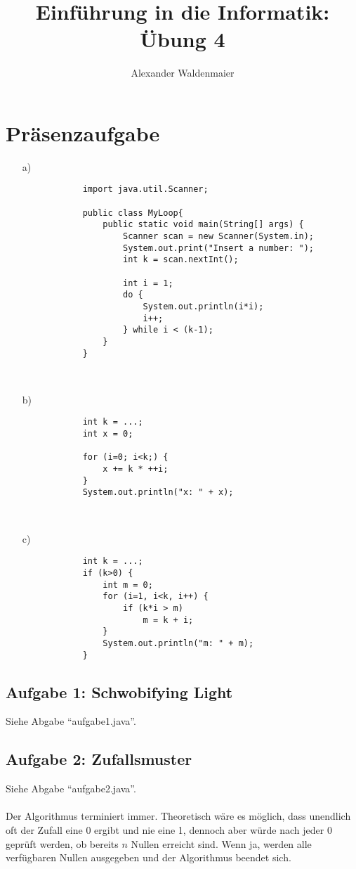 \documentclass{article}
\title{Einführung in die Informatik: Übung 4}
\author{Alexander Waldenmaier}
\begin{document}
    \maketitle

    \section*{Präsenzaufgabe}
    \begin{enumerate}
        \item[a)] 
        \begin{lstlisting}
            import java.util.Scanner;

            public class MyLoop{
                public static void main(String[] args) {
                    Scanner scan = new Scanner(System.in);
                    System.out.print("Insert a number: ");
                    int k = scan.nextInt();

                    int i = 1; 
                    do {
                        System.out.println(i*i);
                        i++;
                    } while i < (k-1);
                }
            }
        \end{lstlisting} \hfill\\
        \item[b)] 
        \begin{lstlisting}
            int k = ...;
            int x = 0;

            for (i=0; i<k;) {
                x += k * ++i;
            }
            System.out.println("x: " + x);
        \end{lstlisting}\hfill \\
        \item[c)] 
        \begin{lstlisting}
            int k = ...;
            if (k>0) {
                int m = 0;
                for (i=1, i<k, i++) {
                    if (k*i > m)
                        m = k + i;
                }
                System.out.println("m: " + m);
            } 
        \end{lstlisting}
    \end{enumerate}


    \subsection*{Aufgabe 1: Schwobifying Light}
    Siehe Abgabe "`aufgabe1.java"'.


    \subsection*{Aufgabe 2: Zufallsmuster}
    Siehe Abgabe "`aufgabe2.java"'.\\\\
    Der Algorithmus terminiert immer. Theoretisch wäre es möglich, dass unendlich oft der Zufall eine 0 ergibt und nie eine 1, dennoch aber würde nach jeder 0 geprüft werden, ob bereits $n$ Nullen erreicht sind. Wenn ja, werden alle verfügbaren Nullen ausgegeben und der Algorithmus beendet sich.
\end{document}
